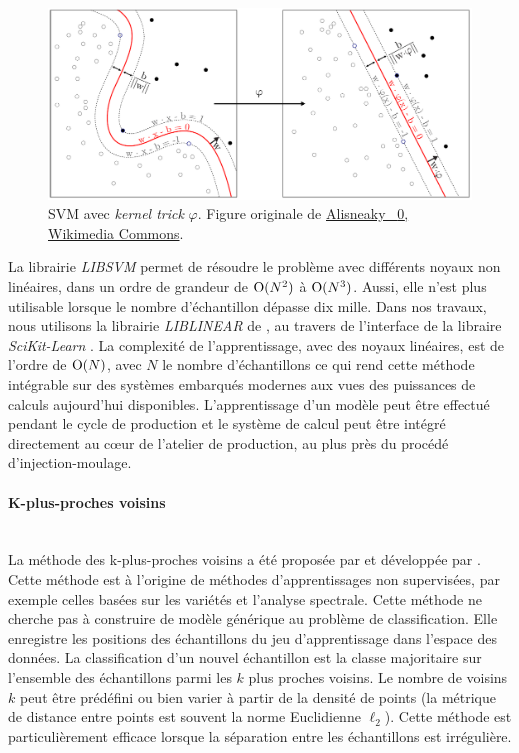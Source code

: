 \begin{figure}[hbtp]
    \centering
    \includegraphics[width=\textwidth,height=\textheight,keepaspectratio]{../Chap3/Figures/Kernel_Machine_Pierre.pdf}
    \caption{SVM avec \emph{kernel trick} $\varphi$. Figure originale de \href{https://commons.wikimedia.org/wiki/File:Kernel_Machine.png}{Alisneaky \ccLogo \ \textnormal{0}, Wikimedia Commons}.}
    \label{fig:svm}
\end{figure}

La librairie \textit{LIBSVM} \cite{chang_libsvm_2011} permet de résoudre le problème avec différents noyaux non linéaires, dans un ordre de grandeur de $\operatorname{O}(N^2)$ à $\operatorname{O}(N^3)$.
Aussi, elle n'est plus utilisable lorsque le nombre d'échantillon dépasse dix mille.
Dans nos travaux, nous utilisons la librairie \textit{LIBLINEAR} de \cite{fan_liblinear_2008}, au travers de l'interface de la libraire \textit{SciKit-Learn} \cite{pedregosa_scikit-learn_2011}.
La complexité de l'apprentissage, avec des noyaux linéaires, est de l'ordre de $\operatorname{O}(N)$, avec $N$ le nombre d'échantillons ce qui rend cette méthode intégrable sur des systèmes embarqués modernes aux vues des puissances de calculs aujourd'hui disponibles.
L'apprentissage d'un modèle peut être effectué pendant le cycle de production et le système de calcul peut être intégré directement au cœur de l'atelier de production, au plus près du procédé d'injection-moulage.

\paragraph{K-plus-proches voisins} \mbox{} \label{parag:knn} \\
La méthode des k-plus-proches voisins a été proposée par \cite{fix_discriminatory_1951} et développée par \cite{cover_nearest_1967}.
Cette méthode est à l'origine de méthodes d'apprentissages non supervisées, par exemple celles basées sur les variétés et l'analyse spectrale.
Cette méthode ne cherche pas à construire de modèle générique au problème de classification.
Elle enregistre les positions des échantillons du jeu d'apprentissage dans l'espace des données.
La classification d'un nouvel échantillon est la classe majoritaire sur l'ensemble des échantillons parmi les $k$ plus proches voisins.
Le nombre de voisins $k$ peut être prédéfini ou bien varier à partir de la densité  de points (la métrique de distance entre points est souvent la norme Euclidienne $\ell_{2}$).
Cette méthode est particulièrement efficace lorsque la séparation entre les échantillons est irrégulière.

